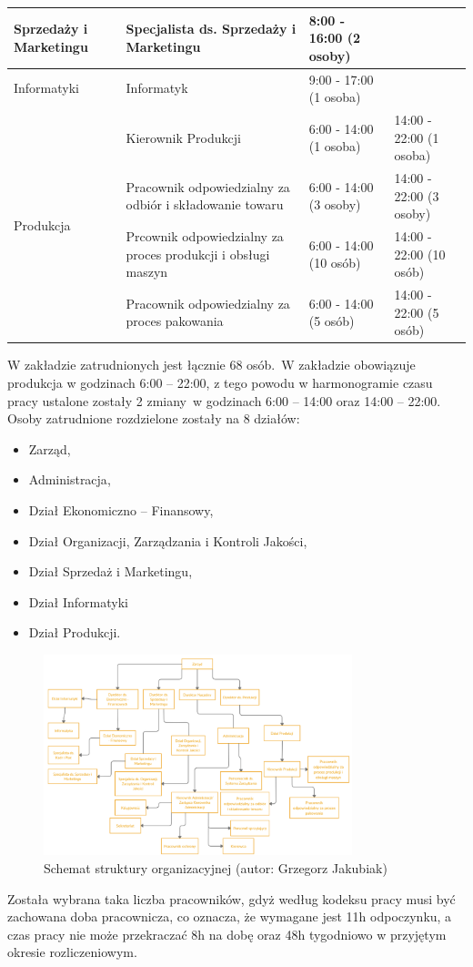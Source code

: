\begin{table}[h]
\begin{tabular}{*{4}{p{}}}
		\hline
		Sprzedaży i Marketingu & Specjalista ds. Sprzedaży i Marketingu & 8:00 - 16:00 (2 osoby) \\
		\hline
		Informatyki & Informatyk & 9:00 - 17:00 (1 osoba) \\
		\hline
		\multirow{4}{*}{Produkcja} & Kierownik Produkcji & 6:00 - 14:00 (1 osoba) & 14:00 - 22:00 (1 osoba) \\
		\cline{2-4}
		 & Pracownik odpowiedzialny za odbiór i składowanie towaru & 6:00 - 14:00 (3 osoby) & 14:00 - 22:00 (3 osoby) \\
		\cline{2-4}
		 & Prcownik odpowiedzialny za proces produkcji i obsługi maszyn & 6:00 - 14:00 (10 osób) & 14:00 - 22:00 (10 osób) \\
		\cline{2-4}
		 & Pracownik odpowiedzialny za proces pakowania & 6:00 - 14:00 (5 osób) & 14:00 - 22:00 (5 osób) \\
		 \hline
	\end{tabular}
\end{table}

W zakładzie zatrudnionych jest łącznie 68 osób. W zakładzie obowiązuje produkcja w godzinach 6:00 – 22:00, z tego powodu w harmonogramie czasu pracy ustalone zostały 2 zmiany w godzinach 6:00 – 14:00 oraz 14:00 – 22:00. Osoby zatrudnione rozdzielone zostały na 8 działów:
\begin{itemize}
	\item \textsf{Zarząd},
	\item \textsf{Administracja},
	\item \textsf{Dział Ekonomiczno – Finansowy},
	\item\textsf{Dział Organizacji, Zarządzania i Kontroli Jakości},
	\item\textsf{Dział Sprzedaż i Marketingu},
	\item \textsf{Dział Informatyki}
	\item \textsf{Dział Produkcji}. 
\end{itemize}

\begin{figure}[H]
	\centering
	\includegraphics[width=0.8\textwidth]{./sec17/struktura_organizacyjna.png}
	\caption{Schemat struktury organizacyjnej (autor: Grzegorz Jakubiak)}
\end{figure}

		Została wybrana taka liczba pracowników, gdyż według kodeksu pracy musi być zachowana doba pracownicza, co oznacza, że wymagane jest 11h odpoczynku, a czas pracy nie może przekraczać 8h na dobę oraz 48h tygodniowo w przyjętym okresie rozliczeniowym. 
